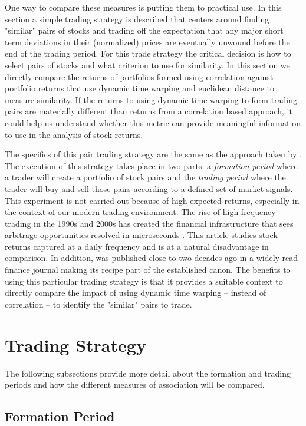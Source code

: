 \documentclass[12pt]{report}
\begin{document}
One way to compare these measures is putting them to practical use. In this section a simple trading strategy is described that centers around finding "similar" pairs of stocks and trading off the expectation that any major short term deviations in their (normalized) prices are eventually unwound before the end of the trading period. For this trade strategy the critical decision is how to select pairs of stocks and what criterion to use for similarity. In this section we directly compare the returns of portfolios formed using correlation against portfolio returns that use dynamic time warping and euclidean distance to measure similarity. If the returns to using dynamic time warping to form trading pairs are materially different than returns from a correlation based approach, it could help us understand whether this metric can provide meaningful information to use in the analysis of stock returns.

The specifics of this pair trading strategy are the same as the approach taken by \cite{Gatev_et_al_2006}. The execution of this strategy takes place in two parts: a \textit{formation period} where a trader will create a portfolio of stock pairs and the \textit{trading period} where the trader will buy and sell those pairs according to a defined set of market signals. This experiment is not carried out because of high expected returns, especially in the context of our modern trading environment. The rise of high frequency trading in the 1990s and 2000s has created the financial infrastructure that sees arbitrage opportunities resolved in microseconds \cite{Aquilina_et_al_2021}. This article studies stock returns captured at a daily frequency and is at a natural disadvantage in comparison. In addition, \cite{Gatev_et_al_2006} was published close to two decades ago in a widely read finance journal making its recipe part of the established canon. The benefits to using this particular trading strategy is that it provides a suitable context to directly compare the impact of using dynamic time warping -- instead of correlation -- to identify the "similar" pairs to trade.

\section{Trading Strategy}

The following subsections provide more detail about the formation and trading periods and how the different measures of association will be compared.

\subsection{Formation Period}
\end{document}
